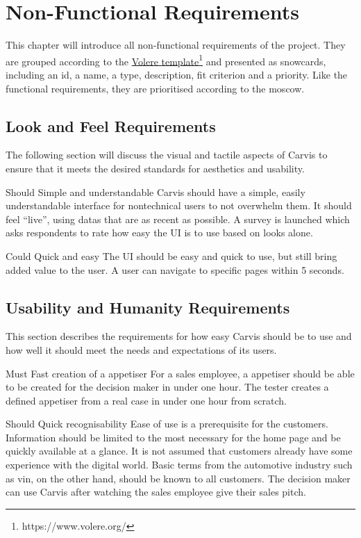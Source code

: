 \chapter{Non-Functional Requirements}
This chapter will introduce all non-functional requirements of the project. They are grouped according to the \href{https://www.volere.org/}{Volere template}\footnote[3]{https://www.volere.org/} and presented as snowcards, including an id, a name, a type, description, fit criterion and a priority. Like the functional requirements, they are prioritised according to the \gls{moscow}. 

\section{Look and Feel Requirements}
The following section will discuss the visual and tactile aspects of Carvis to ensure that it meets the desired standards for aesthetics and usability.
\label{sec:appearancerequirements}

{Should}
{Simple and understandable}
{Carvis should have a simple, easily understandable interface for \gls{nontechnical} users to not overwhelm them. It should feel \enquote{live}, using \glspl{data} that are as recent as possible.}
{A survey is launched which asks respondents to rate how easy the UI is to use based on looks alone.}

{Could}
{Quick and easy}
{The UI should be easy and quick to use, but still bring added value to the user.}
{A user can navigate to specific pages within 5 seconds.}

\section{Usability and Humanity Requirements}
This section describes the requirements for how easy Carvis should be to use and how well it should meet the needs and expectations of its users.

{Must}
{Fast creation of a \gls{appetiser}}
{For a sales employee, a \gls{appetiser} should be able to be created for the decision maker in under one hour.}
{The tester creates a defined \gls{appetiser} from a real case in under one hour from scratch.}

{Should}
{Quick recognisability}
{Ease of use is a prerequisite for the customers. Information should be limited to the most necessary for the home page and be quickly available at a glance. It is not assumed that customers already have some experience with the digital world. Basic terms from the automotive industry such as \gls{vin}, on the other hand, should be known to all customers.}
{The decision maker can use Carvis after watching the sales employee give their sales pitch.}

